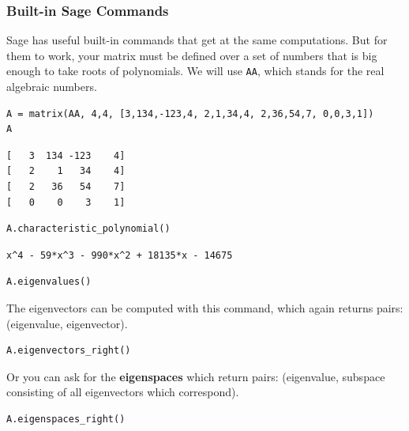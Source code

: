 \documentclass[10pt,]{book}
\newcommand{\terminology}[1]{\textbf{#1}}
\theoremstyle{plain}
\theoremstyle{definition}
\numberwithin{equation}{section}
\begin{document}
\subsubsection[Built-in Sage Commands]{Built-in Sage Commands}\label{subsubsection-49}

        Sage has useful built-in commands that get at the same computations. But
        for them to work, your matrix must be defined over a set of numbers that
        is big enough to take roots of polynomials. We will use \verb?AA?, which
        stands for the real algebraic numbers.
\begin{lstlisting}[style=sageinput]
A = matrix(AA, 4,4, [3,134,-123,4, 2,1,34,4, 2,36,54,7, 0,0,3,1])
A
\end{lstlisting}
\begin{lstlisting}[style=sageoutput]
[   3  134 -123    4]
[   2    1   34    4]
[   2   36   54    7]
[   0    0    3    1]
\end{lstlisting}
\begin{lstlisting}[style=sageinput]
A.characteristic_polynomial()
\end{lstlisting}
\begin{lstlisting}[style=sageoutput]
x^4 - 59*x^3 - 990*x^2 + 18135*x - 14675
\end{lstlisting}
\begin{lstlisting}[style=sageinput]
A.eigenvalues()
\end{lstlisting}
\par
The eigenvectors can be computed with this command, which again returns
        pairs: (eigenvalue, eigenvector).
\begin{lstlisting}[style=sageinput]
A.eigenvectors_right()
\end{lstlisting}
\par

        Or you can ask for the \terminology{eigenspaces} which return pairs:
        (eigenvalue, subspace consisting of all eigenvectors which correspond).
\begin{lstlisting}[style=sageinput]
A.eigenspaces_right()
\end{lstlisting}
\typeout{************************************************}
\typeout{************************************************}
\end{document}
